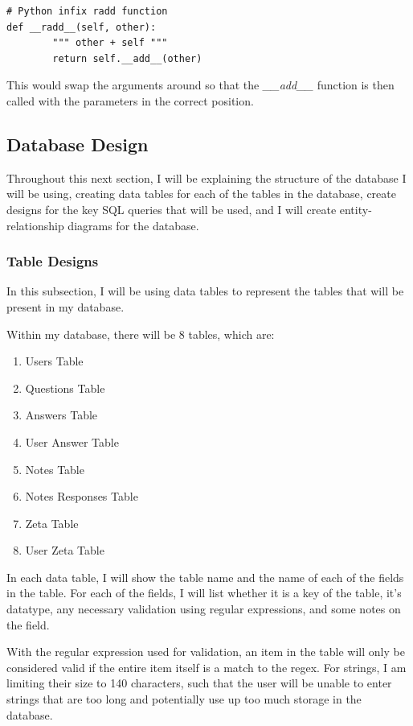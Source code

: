 \documentclass{article}
\begin{document}
\begin{lstlisting}
# Python infix radd function
def __radd__(self, other):
        """ other + self """
        return self.__add__(other)
\end{lstlisting}

This would swap the arguments around so that the \textit{\_\_add\_\_} function is then called with the parameters in the correct position.

\clearpage
\subsection{Database Design}

Throughout this next section, I will be explaining the structure of the database I will be using, creating data tables for each of the tables in the database, create designs for the key SQL queries that will be used, and I will create entity-relationship diagrams for the database.

\subsubsection{Table Designs}
In this subsection, I will be using data tables to represent the tables that will be present in my database.

Within my database, there will be 8 tables, which are:

\begin{enumerate}
    \item Users Table
    \item Questions Table
    \item Answers Table
    \item User Answer Table
    \item Notes Table
    \item Notes Responses Table
    \item Zeta Table
    \item User Zeta Table
\end{enumerate}

In each data table, I will show the table name and the name of each of the fields in the table. For each of the fields, I will list whether it is a key of the table, it's datatype, any necessary validation using regular expressions, and some notes on the field.

With the regular expression used for validation, an item in the table will only be considered valid if the entire item itself is a match to the regex. For strings, I am limiting their size to 140 characters, such that the user will be unable to enter strings that are too long and potentially use up too much storage in the database.
\end{document}
